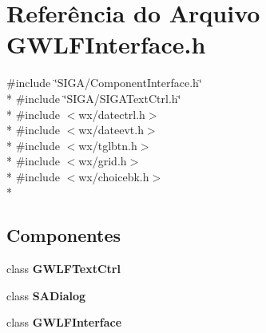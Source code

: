 \section{Referência do Arquivo G\+W\+L\+F\+Interface.\+h}
\label{_g_w_l_f_interface_8h}
{\ttfamily \#include \char`\"{}S\+I\+G\+A/\+Component\+Interface.\+h\char`\"{}}\\*
{\ttfamily \#include \char`\"{}S\+I\+G\+A/\+S\+I\+G\+A\+Text\+Ctrl.\+h\char`\"{}}\\*
{\ttfamily \#include $<$wx/datectrl.\+h$>$}\\*
{\ttfamily \#include $<$wx/dateevt.\+h$>$}\\*
{\ttfamily \#include $<$wx/tglbtn.\+h$>$}\\*
{\ttfamily \#include $<$wx/grid.\+h$>$}\\*
{\ttfamily \#include $<$wx/choicebk.\+h$>$}\\*
\subsection*{Componentes}
\begin{DoxyCompactItemize}
\item 
class {\bf G\+W\+L\+F\+Text\+Ctrl}
\item 
class {\bf S\+A\+Dialog}
\item 
class {\bf G\+W\+L\+F\+Interface}
\end{DoxyCompactItemize}
